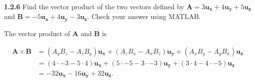 \documentclass{article}
\begin{document}
\textbf{1.2.6} Find the vector product of the two vectors defined by $\mathbf{A} = 3\mathbf{u_x} + 4\mathbf{u_y} +
	5\mathbf{u_z}$ and $\mathbf{B} = -5\mathbf{u_x} + 4\mathbf{u_y} - 3\mathbf{u_z}$. Check your answer using MATLAB.\@

\vspace{24pt}

The vector product of $\mathbf{A}$ and $\mathbf{B}$ is

\begin{equation*}
	\begin{split}
		\mathbf{A} \times \mathbf{B} & = (A_y B_z - A_z B_y)\mathbf{u_x} + (A_z B_x - A_x B_z)\mathbf{u_y} + (A_x B_y - A_y B_x)\mathbf{u_z} \\
		& = (4 \cdot -3 - 5 \cdot 4)\mathbf{u_x} + (5 \cdot -5 - 3 \cdot -3)\mathbf{u_y} + (3 \cdot 4 - 4 \cdot -5)\mathbf{u_z} \\
		& = -32\mathbf{u_x} - 16\mathbf{u_y} + 32\mathbf{u_z}.
	\end{split}
\end{equation*}
\end{document}

